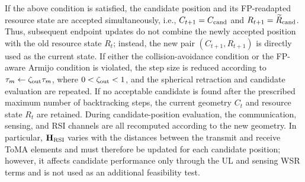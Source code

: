 \documentclass[letterpaper,journal]{IEEEtran}
\begin{document}
If the above condition is satisfied, the candidate position and its FP-readapted resource state are accepted simultaneously, i.e., $C_{t+1}=C_{\rm cand}$ and $R_{t+1}=\widetilde R_{\rm cand}$. Thus, subsequent endpoint updates do not combine the newly accepted position with the old resource state $R_t$; instead, the new pair $(C_{t+1},R_{t+1})$ is directly used as the current state. If either the collision-avoidance condition or the FP-aware Armijo condition is violated, the step size is reduced according to $\tau_m\leftarrow\zeta_{\rm out}\tau_m$, where $0<\zeta_{\rm out}<1$, and the spherical retraction and candidate evaluation are repeated. If no acceptable candidate is found after the prescribed maximum number of backtracking steps, the current geometry $C_t$ and resource state $R_t$ are retained. During candidate-position evaluation, the communication, sensing, and RSI channels are all recomputed according to the new geometry. In particular, $\mathbf H_{\rm RSI}$ varies with the distances between the transmit and receive ToMA elements and must therefore be updated for each candidate position; however, it affects candidate performance only through the UL and sensing WSR terms and is not used as an additional feasibility test.
\end{document}
